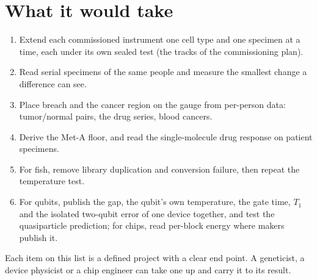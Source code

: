 \section{What it would take}
\begin{enumerate}
\item Extend each commissioned instrument one cell type and one specimen at a time, each under its own sealed test (the tracks of the commissioning plan).
\item Read serial specimens of the same people and measure the smallest change a difference can see.
\item Place breach and the cancer region on the gauge from per-person data: tumor/normal pairs, the drug series, blood cancers.
\item Derive the Met-A floor, and read the single-molecule drug response on patient specimens.
\item For fish, remove library duplication and conversion failure, then repeat the temperature test.
\item For qubits, publish the gap, the qubit's own temperature, the gate time, $T_1$ and the isolated two-qubit error of one device together, and test the
quasiparticle prediction; for chips, read per-block energy where makers publish it.
\end{enumerate}

Each item on this list is a defined project with a clear end point. A geneticist, a device physicist or a chip engineer can take one up and carry it to its result.
